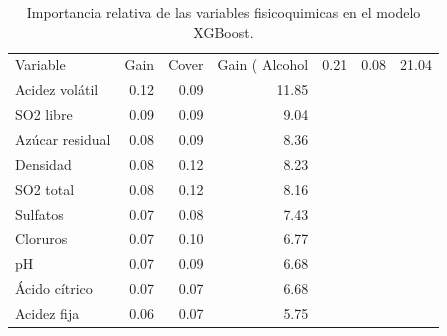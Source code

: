 \begin{table}[ht]
\centering
\begin{tabular}{lrrr}
  \toprule
Variable & Gain & Cover & Gain (%
  \midrule
Alcohol & 0.21 & 0.08 & 21.04 \\ 
  Acidez volátil & 0.12 & 0.09 & 11.85 \\ 
  SO2 libre & 0.09 & 0.09 & 9.04 \\ 
  Azúcar residual & 0.08 & 0.09 & 8.36 \\ 
  Densidad & 0.08 & 0.12 & 8.23 \\ 
  SO2 total & 0.08 & 0.12 & 8.16 \\ 
  Sulfatos & 0.07 & 0.08 & 7.43 \\ 
  Cloruros & 0.07 & 0.10 & 6.77 \\ 
  pH & 0.07 & 0.09 & 6.68 \\ 
  Ácido cítrico & 0.07 & 0.07 & 6.68 \\ 
  Acidez fija & 0.06 & 0.07 & 5.75 \\ 
   \bottomrule
\end{tabular}
\caption{Importancia relativa de las variables fisicoquimicas en el modelo XGBoost.} 
\label{tab:importancia}
\end{table}
